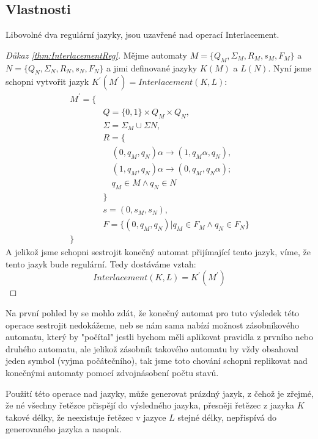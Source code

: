 \subsection{Vlastnosti}
\begin{theorem} \label{thm:InterlacementReg}
	Libovolné dva regulární jazyky, jsou uzavřené nad operací Interlacement.
\end{theorem}

\begin{proof}[Důkaz \ref{thm:InterlacementReg}]
	Mějme automaty $M=\{Q_{M},\Sigma_{M}, R_{M}, s_{M}, F_{M}\}$ a $N=\{Q_{N},\Sigma_{N}, R_{N}, s_{N}, F_{N}\}$ a jimi definované jazyky $K(M)$ a $L(N)$.
	Nyní jsme schopni vytvořit jazyk $K^{'}(M^{'})=Interlacement(K,L)$:
	\begin{equation}\label{eq:interlaceProof}
		\begin{split}
			M^{'} = \{&\\
			&Q = \{0,1\}\times Q_{M}\times Q_{N},\\
			&\Sigma = \Sigma_{M} \cup \Sigma{N},\\
			& R = \{\\
			&\quad	(0,q_{M},q_{N})\alpha \longrightarrow(1,q_{M}\alpha,q_{N}),\\
			&\quad	(1,q_{M},q_{N})\alpha \longrightarrow(0,q_{M},q_{N}\alpha);\\
			&\quad q_{M} \in M \land q_{N} \in N \\
			&\}\\
			&s = (0,s_{M},s_{N}),\\
			&F = \{(0,q_{M},q_{N})| q_{M} \in F_{M} \land q_{N} \in F_{N}\}\\
			\}&
		\end{split}
	\end{equation}
	A jelikož jsme schopni sestrojit konečný automat přijímající tento jazyk, víme, že tento jazyk bude regulární. Tedy dostáváme vztah:
	$$Interlacement(K,L)=K^{'}(M^{'})$$ 
\end{proof}
\bigskip 
Na první pohled by se mohlo zdát, že konečný automat pro tuto výsledek této operace sestrojit nedokážeme, neb se nám sama nabízí možnost zásobníkového automatu, který by "počítal" jestli bychom měli aplikovat pravidla z prvního nebo druhého automatu, ale jelikož zásobník takového automatu by vždy obsahoval jeden symbol (vyjma počátečního), tak jsme toto chování schopni replikovat nad konečnými automaty pomocí zdvojnásobení počtu stavů.

Použití této operace nad jazyky, může generovat prázdný jazyk, z čehož je zřejmé, že né všechny řetězce přispějí do výsledného jazyka, přesněji řetězec z jazyka $K$ takové délky, že neexistuje řetězec v jazyce $L$ stejné délky, nepřispívá do generovaného jazyka a naopak.

